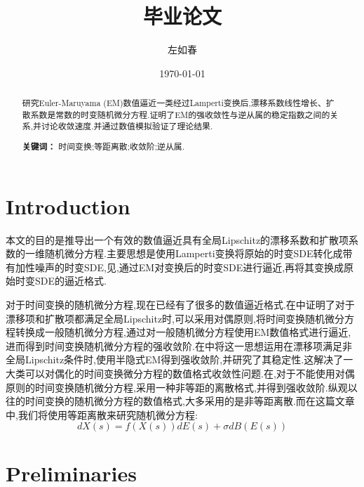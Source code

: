 \documentclass[12pt,final]{article}
\title{毕业论文}
\author{左如春}
\date{\today}
\numberwithin{equation}{section}
\numberwithin{figure}{section}
\numberwithin{table}{section}
\theoremstyle{plain}
\theoremstyle{definition}
\theoremstyle{remark}
\begin{document}
\maketitle

\begin{abstract}
研究Euler-Maruyama (EM)数值逼近一类经过Lamperti变换后,漂移系数线性增长、扩散系数是常数的时变随机微分方程.证明了EM的强收敛性与逆从属的稳定指数之间的关系,并讨论收敛速度.并通过数值模拟验证了理论结果.

\medskip
\noindent\textbf{关键词：} 时间变换;等距离散;收敛阶;逆从属.
\end{abstract}





\section{Introduction}

本文的目的是推导出一个有效的数值逼近具有全局Lipschitz的漂移系数和扩散项系数的一维随机微分方程.主要思想是使用Lamperti变换将原始的时变SDE转化成带有加性噪声的时变SDE,见\cite{iacus2008simulation},通过EM对变换后的时变SDE进行逼近,再将其变换成原始时变SDE的逼近格式.

对于时间变换的随机微分方程,现在已经有了很多的数值逼近格式.在\cite{jum2014strong}中证明了对于漂移项和扩散项都满足全局Lipschitz时,可以采用对偶原则,将时间变换随机微分方程转换成一般随机微分方程,通过对一般随机微分方程使用EM数值格式进行逼近,进而得到时间变换随机微分方程的强收敛阶.在\cite{deng2020semi}中将这一思想运用在漂移项满足非全局Lipschitz条件时,使用半隐式EM得到强收敛阶,并研究了其稳定性.这解决了一大类可以对偶化的时间变换微分方程的数值格式收敛性问题.在\cite{jin2019strong},对于不能使用对偶原则的时间变换随机微分方程,采用一种非等距的离散格式,并得到强收敛阶.纵观以往的时间变换的随机微分方程的数值格式,大多采用的是非等距离散.而在这篇文章中,我们将使用等距离散来研究随机微分方程:
\begin{equation}\label{basic SDE}
	dX(s)=f(X(s))dE(s)+\sigma dB(E(s))
\end{equation}

\section{Preliminaries}
\end{document}
